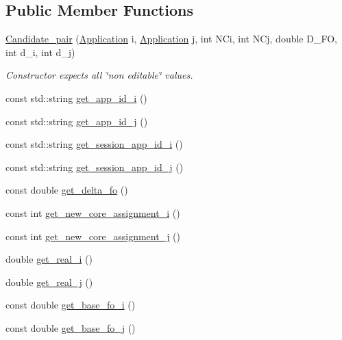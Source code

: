 \subsection*{Public Member Functions}
\begin{DoxyCompactItemize}
\item 
\hyperlink{classCandidate__pair_a59168f369264a7cd8bd7ddb16f23c785}{Candidate\-\_\-pair} (\hyperlink{classApplication}{Application} i, \hyperlink{classApplication}{Application} j, int N\-Ci, int N\-Cj, double D\-\_\-\-F\-O, int d\-\_\-i, int d\-\_\-j)
\begin{DoxyCompactList}\small\item\em Constructor expects all \char`\"{}non editable\char`\"{} values. \end{DoxyCompactList}\item 
const std\-::string \hyperlink{classCandidate__pair_a8fcc74d1e2ad95ab0ecb483a2ceb39b0}{get\-\_\-app\-\_\-id\-\_\-i} ()
\item 
const std\-::string \hyperlink{classCandidate__pair_aaee11e17681cfe95daed61e23b3bd6dc}{get\-\_\-app\-\_\-id\-\_\-j} ()
\item 
const std\-::string \hyperlink{classCandidate__pair_a3d7cb54ffabff340b583925427424085}{get\-\_\-session\-\_\-app\-\_\-id\-\_\-i} ()
\item 
const std\-::string \hyperlink{classCandidate__pair_a8e2faa0c4a09de7667d760a7de0b9596}{get\-\_\-session\-\_\-app\-\_\-id\-\_\-j} ()
\item 
const double \hyperlink{classCandidate__pair_a4d45f63a1ffc4d420b28e88ae7e1dc99}{get\-\_\-delta\-\_\-fo} ()
\item 
const int \hyperlink{classCandidate__pair_a986854ee106c5d7cb64a7ab1161963f2}{get\-\_\-new\-\_\-core\-\_\-assignment\-\_\-i} ()
\item 
const int \hyperlink{classCandidate__pair_ab008e2c787a8ee44ab0102a280d9bea6}{get\-\_\-new\-\_\-core\-\_\-assignment\-\_\-j} ()
\item 
double \hyperlink{classCandidate__pair_a829335d66b073892cba3a89a90a9c5c8}{get\-\_\-real\-\_\-i} ()
\item 
double \hyperlink{classCandidate__pair_af2dc9a093dced6724b85018cfdb307cd}{get\-\_\-real\-\_\-j} ()
\item 
const double \hyperlink{classCandidate__pair_a82a48babd2f32c73e1f167d54e8c6ebd}{get\-\_\-base\-\_\-fo\-\_\-i} ()
\item 
const double \hyperlink{classCandidate__pair_a3f36cbb93291e8a72a6b3e88737d2a85}{get\-\_\-base\-\_\-fo\-\_\-j} ()

\end{DoxyCompactItemize}
